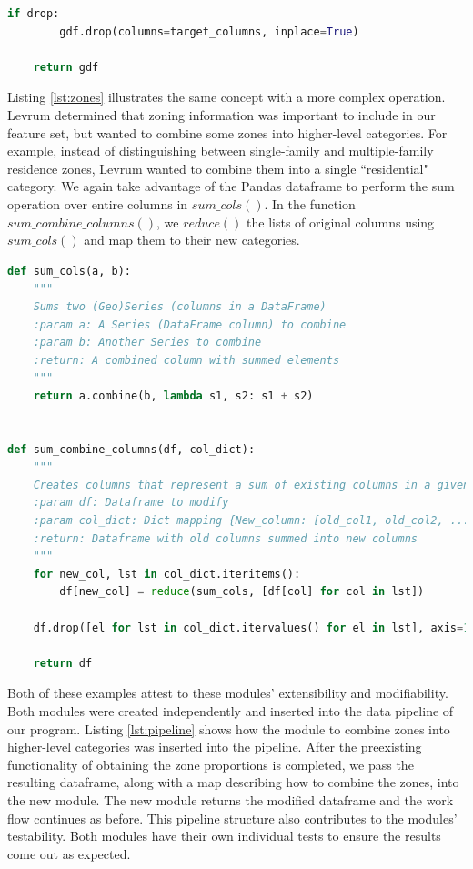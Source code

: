 \documentclass[onecolumn, draftclsnofoot,10pt, compsoc]{IEEEtran}
\begin{document}
\begin{singlespace}
\begin{lstlisting}[language=Python, caption={Extracting population and employment density from raw data},label={lst:density}, captionpos=b]
    if drop:
        gdf.drop(columns=target_columns, inplace=True)

    return gdf
\end{lstlisting} 

Listing \ref{lst:zones} illustrates the same concept with a more complex operation. Levrum determined that zoning information was important to include in our feature set, but wanted to combine some zones into higher-level categories. For example, instead of distinguishing between single-family and multiple-family residence zones, Levrum wanted to combine them into a single ``residential" category. We again take advantage of the Pandas dataframe to perform the sum operation over entire columns in $sum\_cols()$. In the function $sum\_combine\_columns()$,  we $reduce()$ the lists of original columns using $sum\_cols()$ and map them to their new categories.

\begin{lstlisting}[language=Python, caption={Combining zone proportions into higher-level zones.}, label={lst:zones}, captionpos=b]
def sum_cols(a, b):
    """
    Sums two (Geo)Series (columns in a DataFrame) 
    :param a: A Series (DataFrame column) to combine
    :param b: Another Series to combine
    :return: A combined column with summed elements
    """
    return a.combine(b, lambda s1, s2: s1 + s2)


def sum_combine_columns(df, col_dict):
    """
    Creates columns that represent a sum of existing columns in a given DataFrame.
    :param df: Dataframe to modify
    :param col_dict: Dict mapping {New_column: [old_col1, old_col2, ...]
    :return: Dataframe with old columns summed into new columns
    """
    for new_col, lst in col_dict.iteritems():
        df[new_col] = reduce(sum_cols, [df[col] for col in lst])

    df.drop([el for lst in col_dict.itervalues() for el in lst], axis=1, inplace=True)

    return df
\end{lstlisting}

Both of these examples attest to these modules' extensibility and modifiability. Both modules were created independently and inserted into the data pipeline of our program. Listing \ref{lst:pipeline} shows how the module to combine zones into higher-level categories was inserted into the pipeline. After the preexisting functionality of obtaining the zone proportions is completed, we pass the resulting dataframe, along with a map describing how to combine the zones, into the new module. The new module returns the modified dataframe and the work flow continues as before. This pipeline structure also contributes to the modules' testability. Both modules have their own individual tests to ensure the results come out as expected.


\end{singlespace}
\end{document}
